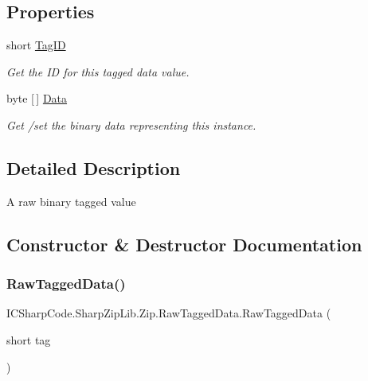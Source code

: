 \subsection*{Properties}
\begin{DoxyCompactItemize}
\item 
short \hyperlink{class_i_c_sharp_code_1_1_sharp_zip_lib_1_1_zip_1_1_raw_tagged_data_a15db758eb0959d9e00bea64693265d07}{Tag\+ID}
\begin{DoxyCompactList}\small\item\em Get the ID for this tagged data value. \end{DoxyCompactList}\item 
byte \mbox{[}$\,$\mbox{]} \hyperlink{class_i_c_sharp_code_1_1_sharp_zip_lib_1_1_zip_1_1_raw_tagged_data_a2928db9f6004f76578dde8e76bdd6d11}{Data}
\begin{DoxyCompactList}\small\item\em Get /set the binary data representing this instance. \end{DoxyCompactList}\end{DoxyCompactItemize}


\subsection{Detailed Description}
A raw binary tagged value 



\subsection{Constructor \& Destructor Documentation}
\mbox{\label{class_i_c_sharp_code_1_1_sharp_zip_lib_1_1_zip_1_1_raw_tagged_data_a0f9b5696c2620e36dbef24d91b4ebc39}} 
\subsubsection{\texorpdfstring{Raw\+Tagged\+Data()}{RawTaggedData()}\hspace{0.1cm}{\footnotesize\ttfamily [1/2]}}
{\footnotesize\ttfamily I\+C\+Sharp\+Code.\+Sharp\+Zip\+Lib.\+Zip.\+Raw\+Tagged\+Data.\+Raw\+Tagged\+Data (\begin{DoxyParamCaption}\item[{short}]{tag }\end{DoxyParamCaption})\hspace{0.3cm}{\ttfamily [inline]}}



